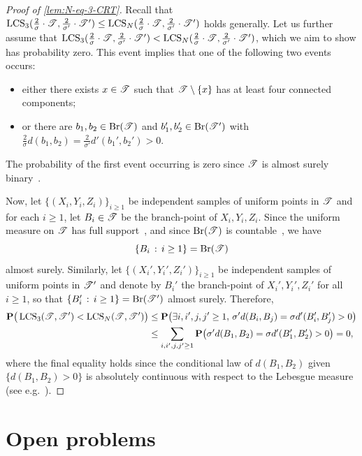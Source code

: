 \documentclass[11pt,reqno]{amsart}
\newcommand{\LCS}{\operatorname{LCS}}
\begin{document}
\begin{proof}[Proof of \cref{lem:N-eq-3-CRT}]
Recall that $\LCS_3(\frac{2}{\sigma}\cdot\sT,\frac{2}{\sigma'}\cdot\sT')\leq  \LCS_N(\frac{2}{\sigma}\cdot\sT,\frac{2}{\sigma'}\cdot\sT')$ holds generally. Let us further assume that $\LCS_3(\frac{2}{\sigma}\cdot\sT,\frac{2}{\sigma'}\cdot\sT')<\LCS_N(\frac{2}{\sigma}\cdot\sT,\frac{2}{\sigma'}\cdot\sT')$, which we aim to show has probability zero. This event implies that one of the following two events occurs:
\begin{itemize}
    \item either there exists $x\in \mathscr{T}$ such that $\mathscr{T}\setminus \{x\}$ has at least four connected components;
    \item or there are $b_1,b_2\in \mathrm{Br}(\mathscr{T})$ and $b_1',b_2'\in\mathrm{Br}(\mathscr{T}')$ with $\frac{2}{\sigma}d(b_1,b_2)=\frac{2}{\sigma'}d'(b_1',b_2')>0$.
\end{itemize}
The probability of the first event occurring is zero since $\mathscr{T}$ is almost surely binary~\cite{aldous1991continuumI}. 

Now, let $\{(X_i,Y_i,Z_i)\}_{i\geq 1}$ be independent samples of uniform points in $\mathscr{T}$ and for each $i \geq 1$, let $B_i \in \mathscr{T}$ be the branch-point of $X_i,Y_i,Z_i$. Since the uniform measure on $\mathscr{T}$ has full support~\cite{aldous1991continuumI}, and since $\mathrm{Br}(\mathscr{T})$ is countable~\cite[Lemma 3.1]{duquesne2007growth}, we have 
\[\{ B_i\, :\, i\geq 1 \}=\mathrm{Br}(\mathscr{T})\]
almost surely. Similarly, let $\{(X_i',Y_i',Z_i')\}_{i\geq 1}$ be independent samples of uniform points in $\mathscr{T}'$ and denote by $B_i'$ the branch-point of $X_i',Y_i',Z_i'$ for all $i\geq 1$, so that $\{B_i'\, :\, i\geq 1\}=\mathrm{Br}(\mathscr{T}')$ almost surely. Therefore,
\begin{align*}
\P\big(\LCS_3(\sT,\sT')<\LCS_N(\sT,\sT')\big)&\leq \P\big(\exists i,i',j,j'\geq 1,\, \sigma' d(B_i,B_j)=\sigma d'(B_i',B_j')>0\big)\\
&\leq \sum_{i,i',j,j'\geq 1}\P\big(\sigma 'd(B_1,B_2)=\sigma d'(B_1',B_2')>0\big)=0,
\end{align*}
where the final equality holds since the conditional law of $d(B_1,B_2)$ given $\{d(B_1,B_2)>0\}$ is absolutely continuous with respect to the Lebesgue measure (see e.g.\ \cite[Lemma 21]{aldous1993continuumIII}).
\end{proof}


\section{Open problems}
\label{sec:open-problems}
\end{document}
